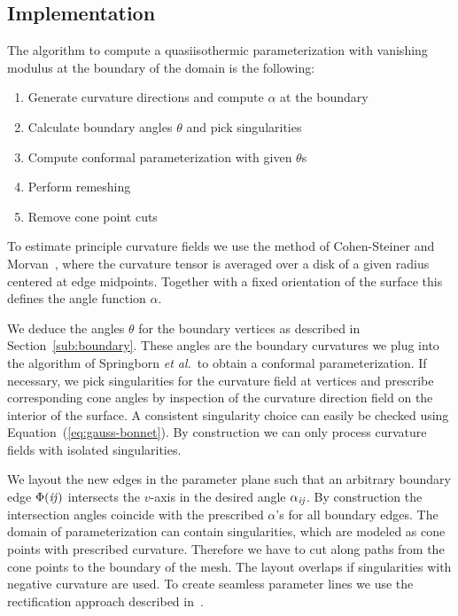 \subsection{Implementation}
\label{sub:parameterization}

The algorithm to compute a quasiisothermic parameterization with vanishing modulus at the 
boundary of the domain is the following:
\begin{enumerate}
\item Generate curvature directions and compute $\alpha$ at the boundary
\item Calculate boundary angles $\theta$ and pick singularities
\item Compute conformal parameterization with given $\theta$s
\item Perform remeshing
\item Remove cone point cuts 
\end{enumerate}

\noindent To estimate principle curvature fields we use the method of Cohen-Steiner and
Morvan~\cite{CohMor03}, where the curvature tensor is averaged over a disk of a
given radius centered at edge midpoints. Together with a fixed orientation
of the surface this defines the angle function
$\alpha$. 

We deduce the angles $\theta$ for the boundary vertices as described in
Section~\ref{sub:boundary}. These angles are the boundary curvatures we plug
into the algorithm of Springborn \emph{et al.}\ to obtain a conformal
parameterization. If necessary, we pick singularities for the curvature field at vertices
and prescribe corresponding cone angles by inspection of the curvature direction
field on the interior of the surface. A consistent singularity choice can
easily be checked using Equation~(\ref{eq:gauss-bonnet}). By construction we 
can only process curvature fields with isolated singularities.

We layout the new edges in the parameter plane such that an arbitrary 
boundary edge $\Phi(\mathrm{\it{ij}})$ intersects the $v$-axis in the desired angle 
$\alpha_{\mathrm{\it{ij}}}$. By construction
the intersection angles coincide with the prescribed $\alpha$'s for all
boundary edges. 
The domain of parameterization can contain singularities, which are
modeled as cone points with prescribed curvature. Therefore we have to 
cut along paths from the cone points to the boundary of the mesh. 
The layout overlaps if singularities with negative curvature are used. 
To create seamless parameter lines we use the rectification approach 
described in~\cite{Springborn2008}.

